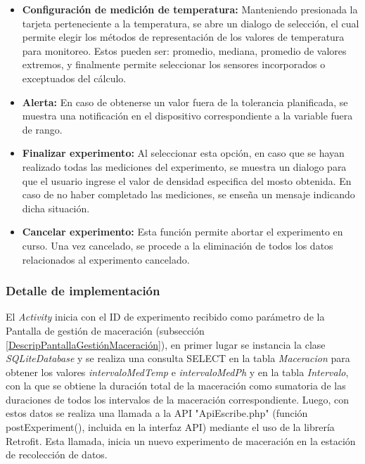                 \begin{itemize}
                    \item \textbf {Configuración de medición de temperatura:} Manteniendo presionada la tarjeta perteneciente a la temperatura, se abre un dialogo de selección, el cual permite elegir los métodos de representación de los valores de temperatura para monitoreo. Estos pueden ser: promedio, mediana, promedio de valores extremos, y finalmente permite seleccionar los sensores incorporados o exceptuados del cálculo.
                    
                    \item \textbf{Alerta:} En caso de obtenerse un valor fuera de la tolerancia planificada, se muestra una notificación en el dispositivo correspondiente a la variable fuera de rango. 
                    
                    \item \textbf{Finalizar experimento:} Al seleccionar esta opción, en caso que se hayan realizado todas las mediciones del experimento, se muestra un dialogo para que el usuario ingrese el valor de densidad especifica del mosto obtenida. En caso de no haber completado las mediciones, se enseña un mensaje indicando dicha situación.
            
                    \item \textbf{Cancelar experimento:} Esta función permite abortar el experimento en curso. Una vez cancelado, se procede a la eliminación de todos los datos relacionados al experimento cancelado.
                \end{itemize}
            
            \subsubsection{Detalle de implementación}
             \par El \textit{Activity} inicia con el ID de experimento recibido como parámetro de la Pantalla de gestión de maceración (subsección \ref{DescripPantallaGestiónMaceración}), en primer lugar se instancia la clase \textit{SQLiteDatabase} y se realiza una consulta SELECT en la tabla \textit{Maceracion} para obtener los valores \textit{intervaloMedTemp} e \textit{intervaloMedPh} y en la tabla \textit{Intervalo}, con la que se obtiene la duración total de la maceración como sumatoria de las duraciones de todos los intervalos de la maceración correspondiente. Luego, con estos datos se realiza una llamada a la API "ApiEscribe.php" (función postExperiment(), incluida en la interfaz API) mediante el uso de la librería Retrofit. Esta llamada, inicia un nuevo experimento de maceración en la estación de recolección de datos.
             
